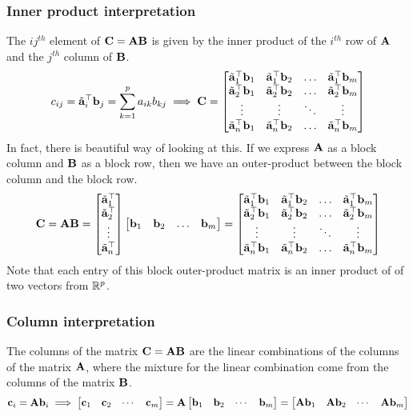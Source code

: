 \subsubsection{Inner product interpretation}
The $ij^{th}$ element of $\mathbf{C} = \mathbf{A}\mathbf{B}$ is given by the inner product of the $i^{th}$ row of $\mathbf{A}$ and the $j^{th}$ column of $\mathbf{B}$.
\begin{equation}
    c_{ij} = \tilde{\mf{a}}_i^\top \mf{b}_j = \sum_{k=1}^{p} a_{ik}b_{kj} \implies \mf{C} = \bmxc \tilde{\mf{a}}_1^\top\mf{b}_1 & \tilde{\mf{a}}_1^\top\mf{b}_2 & \ldots & \tilde{\mf{a}}_1^\top\mf{b}_m \\
    \tilde{\mf{a}}_2^\top\mf{b}_1 & \tilde{\mf{a}}_2^\top\mf{b}_2 & \ldots & \tilde{\mf{a}}_2^\top\mf{b}_m \\
    \vdots & \vdots & \ddots & \vdots \\
    \tilde{\mf{a}}_n^\top\mf{b}_1 & \tilde{\mf{a}}_n^\top\mf{b}_2 & \ldots & \tilde{\mf{a}}_n^\top\mf{b}_m
    \emx
    \label{eq:ch02-mat-mult-inner-prod}
\end{equation}
In fact, there is beautiful way of looking at this. If we express $\mathbf{A}$ as a block column and $\mathbf{B}$ as a block row, then we have an outer-product between the block column and the block row.
\begin{equation}
    \mf{C} = \mf{A}\mf{B} = \bmxc \tilde{\mf{a}}_1^\top \\ \tilde{\mf{a}}_2^\top \\ \vdots \\ \tilde{\mf{a}}_n^\top \emx \bmx \mf{b}_1 & \mf{b}_2 & \ldots & \mf{b}_m \emx = \bmxc \tilde{\mf{a}}_1^\top\mf{b}_1 & \tilde{\mf{a}}_1^\top\mf{b}_2 & \ldots & \tilde{\mf{a}}_1^\top\mf{b}_m \\
    \tilde{\mf{a}}_2^\top\mf{b}_1 & \tilde{\mf{a}}_2^\top\mf{b}_2 & \ldots & \tilde{\mf{a}}_2^\top\mf{b}_m \\
    \vdots & \vdots & \ddots & \vdots \\
    \tilde{\mf{a}}_n^\top\mf{b}_1 & \tilde{\mf{a}}_n^\top\mf{b}_2 & \ldots & \tilde{\mf{a}}_n^\top\mf{b}_m
    \emx
    \label{eq:ch02-mat-mult-inner-prod-vec}
\end{equation}
Note that each entry of this block outer-product matrix is an inner product of of two vectors from $\mathbb{R}^p$.

\subsubsection{Column interpretation}
The columns of the matrix $\mathbf{C} = \mathbf{A}\mathbf{B}$ are the linear combinations of the columns of the matrix $\mathbf{A}$, where the mixture for the linear combination come from the columns of the matrix $\mathbf{B}$.
\begin{equation}
    \mf{c}_i = \mf{A}\mf{b}_i \implies \bmx \mf{c}_1 & \mf{c}_2 & \cdots & \mf{c}_m \emx = \mf{A} \bmx \mf{b}_1 & \mf{b}_2 & \cdots & \mf{b}_m \emx = \bmx \mf{A}\mf{b}_1 & \mf{A}\mf{b}_2 & \cdots & \mf{A}\mf{b}_m \emx
    \label{eq:ch02-mat-mult-col-interp}
\end{equation}

